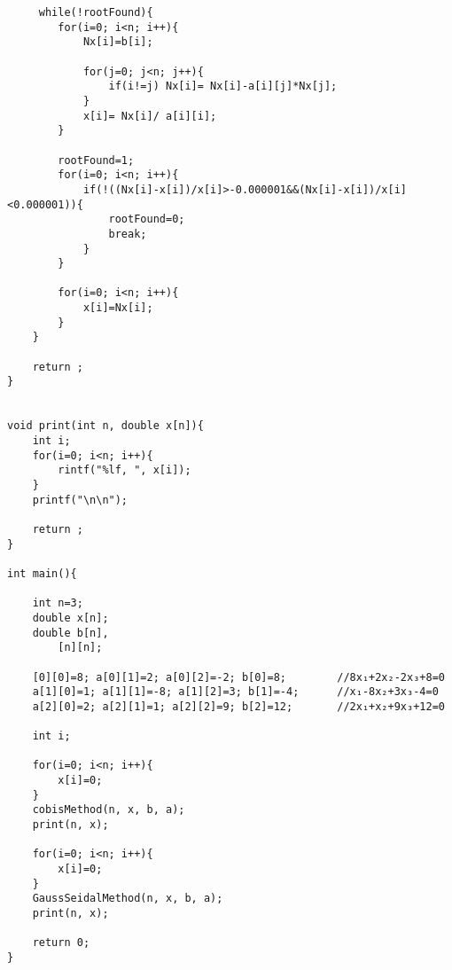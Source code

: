\vspace{\baselineskip}
\begin{tcolorbox}
\begin{verbatim}     
     while(!rootFound){
        for(i=0; i<n; i++){        
            Nx[i]=b[i];
            
            for(j=0; j<n; j++){
                if(i!=j) Nx[i]= Nx[i]-a[i][j]*Nx[j];
            }
            x[i]= Nx[i]/ a[i][i];
        }
        
        rootFound=1;                
        for(i=0; i<n; i++){
            if(!((Nx[i]-x[i])/x[i]>-0.000001&&(Nx[i]-x[i])/x[i]<0.000001)){
                rootFound=0;
                break;
            }
        }
        
        for(i=0; i<n; i++){        
            x[i]=Nx[i];
        }
    }
    
    return ;
}


void print(int n, double x[n]){
    int i;
    for(i=0; i<n; i++){
        rintf("%lf, ", x[i]);
    }
    printf("\n\n");
    
    return ;
}

int main(){
    
    int n=3;            
    double x[n];        
    double b[n],        
        [n][n];         
        
    [0][0]=8; a[0][1]=2; a[0][2]=-2; b[0]=8;        //8x₁+2x₂-2x₃+8=0
    a[1][0]=1; a[1][1]=-8; a[1][2]=3; b[1]=-4;      //x₁-8x₂+3x₃-4=0
    a[2][0]=2; a[2][1]=1; a[2][2]=9; b[2]=12;       //2x₁+x₂+9x₃+12=0
    
    int i;
    
    for(i=0; i<n; i++){     
        x[i]=0;
    }
    cobisMethod(n, x, b, a);
    print(n, x);

    for(i=0; i<n; i++){    
        x[i]=0;
    }
    GaussSeidalMethod(n, x, b, a);
    print(n, x);
    
    return 0;
}

\end{verbatim}
\end{tcolorbox}
\vspace{\baselineskip}
